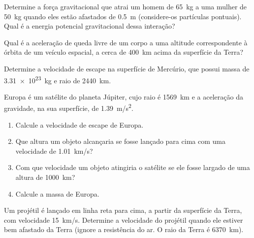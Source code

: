 \documentclass[a4paper]{article}
\begin{document}

 
\begin{exercicio}%
  \begin{inlineenum}%
  \inlineitem Determine a força gravitacional que atrai um homem de \SI{65}{kg} a uma mulher de \SI{50}{kg} quando eles estão afastados de \SI{0.5}{m} (considere-os partículas pontuais).
  \inlineitem Qual é a energia potencial gravitacional dessa interação? 
  \end{inlineenum}
\end{exercicio}

\begin{exercicio*}
  Qual é a aceleração de queda livre de um corpo a uma altitude correspondente à órbita de um veículo espacial, a cerca de \SI{400}{km} acima da superfície da Terra?
\end{exercicio*}

\begin{exercicio}
 Determine a velocidade de escape na superfície de Mercúrio, que possui massa de \SI{3.31e23}{kg} e raio de \SI{2440}{km}.
\end{exercicio}

\begin{exercicio}
 Europa é um satélite do planeta Júpiter, cujo raio é \SI{1569}{km} e a aceleração da gravidade, na sua superfície, de \SI{1.39}{m/s^2}.
\begin{enumerate}
\item Calcule a velocidade de escape de Europa.
\item Que altura um objeto alcançaria se fosse lançado para cima com uma velocidade de \SI{1.01}{km/s}?
\item Com que velocidade um objeto atingiria o satélite se ele fosse largado de uma altura de \SI{1000}{km}?
\item Calcule a massa de Europa.
\end{enumerate}
\end{exercicio}

\begin{exercicio}
 Um projétil é lançado em linha reta para cima, a partir da superfície da Terra, com velocidade \SI{15}{km/s}.
Determine a velocidade do projétil quando ele estiver bem afastado da Terra (ignore a resistência do ar. O raio da Terra é \SI{6370}{km}).
\end{exercicio}
\end{document}
